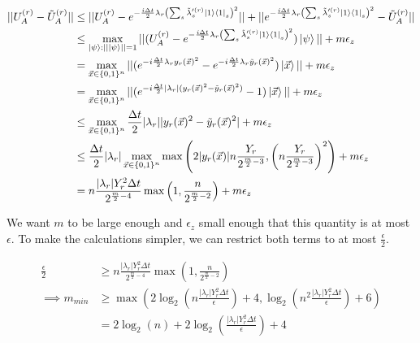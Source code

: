 \begin{equation}
    \begin{split}
        ||U_A^{(r)} - \tilde{U}_A^{(r)}|| &\leq ||U_A^{(r)} - e^{-\frac{i\Delta t}{2}\lambda_r\left(\sum_s \tilde{\lambda}'^{(r)}_s \ket{1}\bra{1}_s\right)^2}|| + ||e^{-\frac{i\Delta t}{2}\lambda_r\left(\sum_s \tilde{\lambda}'^{(r)}_s \ket{1}\bra{1}_s\right)^2} - \tilde{U}_A^{(r)}|| \\
        &\leq \max_{\ket{\psi} : ||\ket{\psi}|| = 1} ||(U_A^{(r)} - e^{-\frac{i\Delta t}{2}\lambda_r\left(\sum_s \tilde{\lambda}'^{(r)}_s \ket{1}\bra{1}_s\right)^2})\ket{\psi}|| + m\epsilon_z \\
        &= \max_{\vec{x} \in \{0, 1\}^n} ||(e^{-i\frac{\Delta t}{2}\lambda_ry_r(\vec{x})^2} - e^{-i\frac{\Delta t}{2}\lambda_r\tilde{y}_r(\vec{x})^2})\ket{\vec{x}}|| + m\epsilon_z \\
        &= \max_{\vec{x} \in \{0, 1\}^n} ||(e^{-i\frac{\Delta t}{2}|\lambda_r|(y_r(\vec{x})^2 - \tilde{y}_r(\vec{x})^2)} - 1)\ket{\vec{x}}|| + m\epsilon_z \\
        &\leq \max_{\vec{x} \in \{0, 1\}^n} \frac{\Delta t}{2}|\lambda_r||y_r(\vec{x})^2 - \tilde{y}_r(\vec{x})^2| + m\epsilon_z \\
        &\leq \frac{\Delta t}{2}|\lambda_r|\max_{\vec{x} \in \{0, 1\}^n} \max\left(2|y_r(\vec{x})|n\frac{Y_r}{2^{\frac{m}{2} - 3}}, \left(n\frac{Y_r}{2^{\frac{m}{2} - 3}}\right)^2\right) + m\epsilon_z \\
        &= n\frac{|\lambda_r| Y_r^2\Delta t}{2^{\frac{m}{2} - 4}}\max\left(1, \frac{n}{2^{\frac{m}{2} - 2}}\right) + m\epsilon_z
    \end{split}
\end{equation}

We want $m$ to be large enough and $\epsilon_z$ small enough that this quantity is at most $\epsilon$. To make the calculations simpler, we can restrict both terms to at most $\frac{\epsilon}{2}$.

\begin{equation}
    \begin{split}
        \frac{\epsilon}{2} &\geq n\frac{|\lambda_r| Y_r^2\Delta t}{2^{\frac{m}{2} - 4}}\max\left(1, \frac{n}{2^{\frac{m}{2} - 2}}\right) \\
        \implies m_{min} &\geq \max(2\log_2\left(n\frac{|\lambda_r|Y_r^2\Delta t}{\epsilon}\right) + 4, \log_2\left(n^2\frac{|\lambda_r|Y_r^2\Delta t}{\epsilon}\right) + 6) \\
        &= 2\log_2(n) + 2\log_2\left(\frac{|\lambda_r|Y_r^2\Delta t}{\epsilon}\right) + 4 \label{eq: m_min}
    \end{split}
\end{equation}

